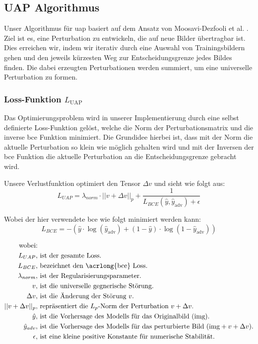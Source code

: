 \subsection{UAP Algorithmus} \label{chap:UAP}

Unser Algorithmus für \acrfull{uap} basiert auf dem Ansatz von Moosavi-Dezfooli et al. \cite{moosavi-dezfooli_universal_2017}. Ziel ist es, eine Perturbation zu entwickeln, die auf neue Bilder übertragbar ist. Dies erreichen wir, indem wir iterativ durch eine Auswahl von Trainingsbildern gehen und den jeweils kürzesten Weg zur Entscheidungsgrenze jedes Bildes finden. Die dabei erzeugten Perturbationen werden summiert, um eine universelle Perturbation zu formen. 

\subsubsection{Loss-Funktion $L_\text{UAP}$}
Das Optimierungsproblem wird in unserer Implementierung durch eine selbst definierte Loss-Funktion gelöst, welche die Norm der Perturbationsmatrix und die inverse \acrlong{bce} Funktion minimiert. Die Grundidee hierbei ist, dass mit der Norm die aktuelle Perturbation so klein wie möglich gehalten wird und mit der Inversen der \acrlong{bce} Funktion die aktuelle Perturbation an die Entscheidungsgrenze gebracht wird. 

Unsere Verlustfunktion optimiert den Tensor $\Delta v$ und sieht wie folgt aus:
\begin{equation}
    L_{UAP} = \lambda_{norm} \cdot ||v + \Delta v||_p + \frac{1}{L_{BCE}(\hat{y}, \hat{y}_{\text{adv}}) + \epsilon}
\label{Loss}
\end{equation}

Wobei der hier verwendete \acrlong{bce} wie folgt minimiert werden kann:
\begin{equation}
L_{BCE} = - (\hat{y} \cdot \log(\hat{y}_{\text{adv}}) + (1-\hat{y}) \cdot \log(1-\hat{y}_{\text{adv}}))
\label{eq:BCE}
\end{equation}

\begin{align*}
\text{wobei:}&\\
L_{UAP}, &\text{ ist der gesamte Loss.} \\
L_{BCE}, &\text{ bezeichnet den \acrlong{bce} Loss.} \\
\lambda_{norm}, &\text{ ist der Regularisierungsparameter.} \\
v, &\text{ ist die universelle gegnerische Störung.} \\
\Delta v, &\text{ ist die Änderung der Störung } v \text{.} \\
||v + \Delta v||_p, &\text{ repräsentiert die } L_p \text{-Norm der Perturbation } v + \Delta v. \\
\hat{y}, &\text{ ist die Vorhersage des Modells für das Originalbild ($\text{img}$).} \\
\hat{y}_{adv}, &\text{ ist die Vorhersage des Modells für das perturbierte Bild ($\text{img} + v + \Delta v$).} \\
\epsilon, &\text{ ist eine kleine positive Konstante für numerische Stabilität.}
\end{align*}

